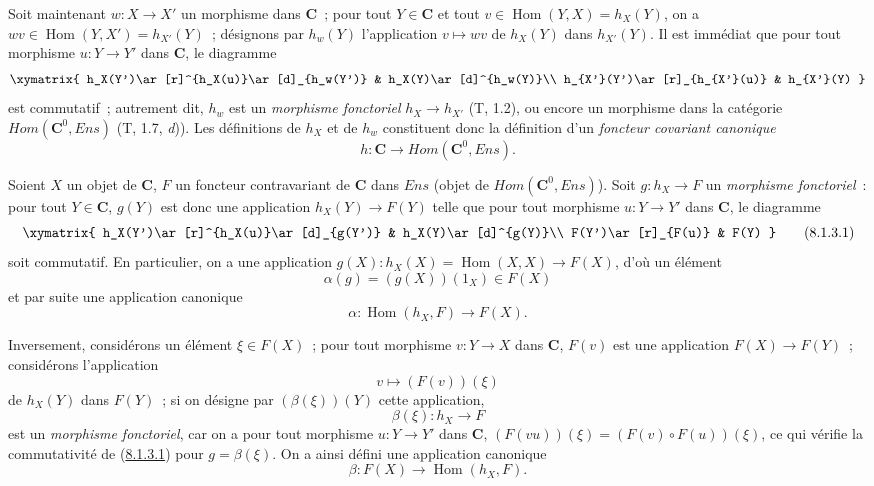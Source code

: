 \begin{env}[8.1.2]
\label{0.8.1.2-fr}
Soit maintenant $w:X\to X'$ un morphisme dans $\boldsymbol{C}$~; pour tout $Y\in\boldsymbol{C}$ et
tout $v\in\operatorname{Hom}(Y,X)=h_X(Y)$, on a
$wv\in\operatorname{Hom}(Y,X')=h_{X'}(Y)$~; désignons par $h_w(Y)$
l'application $v\mapsto wv$ de $h_X(Y)$ dans $h_{X'}(Y)$. Il est immédiat
que pour tout morphisme $u:Y\to Y'$ dans $\boldsymbol{C}$, le diagramme
\[
  \xymatrix{
    h_X(Y')\ar[r]^{h_X(u)}\ar[d]_{h_w(Y')} &
    h_X(Y)\ar[d]^{h_w(Y)}\\
    h_{X'}(Y')\ar[r]_{h_{X'}(u)} &
    h_{X'}(Y)
  }
\]
est commutatif~; autrement dit, $h_w$ est un \emph{morphisme fonctoriel}
$h_X\to h_{X'}$ (T, 1.2), ou encore un morphisme dans la catégorie
$\boldsymbol{\mathit{Hom}}(\boldsymbol{C}^0,\boldsymbol{\mathit{Ens}})$ (T, 1.7, \textit{d})). Les définitions de
$h_X$ et de $h_w$ constituent donc la définition d'un \emph{foncteur
covariant canonique}
\[
  h:\boldsymbol{C}\to\boldsymbol{\mathit{Hom}}(\boldsymbol{C}^0,\boldsymbol{\mathit{Ens}}).
  \tag{8.1.2.1}
\]
\end{env}

\begin{env}[8.1.3]
\label{0.8.1.3-fr}
Soient $X$ un objet de $\boldsymbol{C}$, $F$ un foncteur contravariant de $\boldsymbol{C}$ dans
$\boldsymbol{\mathit{Ens}}$ (objet de $\boldsymbol{\mathit{Hom}}(\boldsymbol{C}^0,\boldsymbol{\mathit{Ens}})$). Soit
$g:h_X\to F$ un \emph{morphisme fonctoriel}~: pour tout $Y\in\boldsymbol{C}$,
$g(Y)$ est donc une application $h_X(Y)\to F(Y)$ telle que pour tout morphisme
$u:Y\to Y'$ dans $\boldsymbol{C}$, le diagramme
\[
  \xymatrix{
    h_X(Y')\ar[r]^{h_X(u)}\ar[d]_{g(Y')} &
    h_X(Y)\ar[d]^{g(Y)}\\
    F(Y')\ar[r]_{F(u)} & F(Y)
  }
  \tag{8.1.3.1}\label{0.8.1.3.1-fr}
\]
soit commutatif. En particulier, on a une application
$g(X):h_X(X)=\operatorname{Hom}(X,X)\to F(X)$, d'où un élément
\[
  \alpha(g)=(g(X))(1_X)\in F(X)
  \tag{8.1.3.2}
\]
et par suite une application canonique
\[
  \alpha:\operatorname{Hom}(h_X,F)\to F(X).
  \tag{8.1.3.3}
\]

Inversement, considérons un élément $\xi\in F(X)$~; pour tout morphisme
$v:Y\to X$ dans $\boldsymbol{C}$, $F(v)$ est une application $F(X)\to F(Y)$~;
considérons l'application
\[
  v\mapsto(F(v))(\xi)
  \tag{8.1.3.4}
\]
de $h_X(Y)$ dans $F(Y)$~; si on désigne par $(\beta(\xi))(Y)$ cette
application,
\[
  \beta(\xi):h_X\to F
  \tag{8.1.3.5}
\]
est un \emph{morphisme fonctoriel}, car on a pour tout morphisme
$u:Y\to Y'$ dans $\boldsymbol{C}$,
$(F(vu))(\xi)=(F(v)\circ F(u))(\xi)$, ce qui vérifie la commutativité de
(\hyperref[0.8.1.3.1-fr]{8.1.3.1}) pour $g=\beta(\xi)$. On a ainsi défini
une application canonique
\[
  \beta:F(X)\to\operatorname{Hom}(h_X,F).
  \tag{8.1.3.6}
\]
\end{env}


